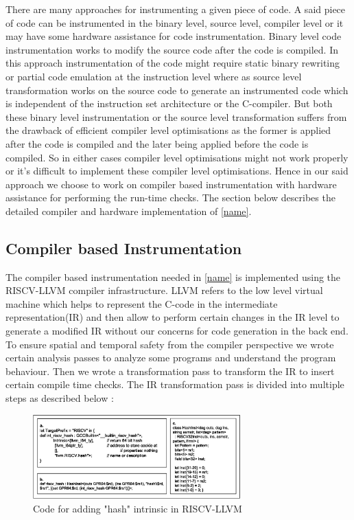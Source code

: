 There are many approaches for instrumenting a given piece of code. A said piece of code can be instrumented in the binary level, source level, compiler level or it may have some hardware assistance for code instrumentation. Binary level code instrumentation works to modify the source code after the code is compiled. In this approach instrumentation of the code might require static binary rewriting or partial code emulation at the instruction level where as source level transformation works on the source code to generate an instrumented code which is independent of the instruction set architecture or the C-compiler. But both these binary level instrumentation or the source level transformation suffers from the drawback of efficient compiler level optimisations as the former is applied after the code is compiled and the later being applied before the code is compiled. So in either cases compiler level optimisations might not work properly or it's difficult to implement these compiler level optimisations. Hence in our said approach we choose to work on compiler based instrumentation with hardware assistance for performing the run-time checks. The section below describes the detailed compiler and hardware implementation of \ref{name}.
\subsection{Compiler based Instrumentation}
The compiler based instrumentation needed in \ref{name} is implemented using the RISCV-LLVM compiler infrastructure. LLVM refers to the low level virtual machine which helps to represent the C-code in the intermediate representation(IR) and then allow to perform certain changes in the IR level to generate a modified IR without our concerns for code generation in the back end. To ensure spatial and temporal safety from the compiler perspective we wrote certain analysis passes to analyze some programs and understand the program behaviour. Then we wrote a transformation pass to transform the IR to insert certain compile time checks. The IR transformation pass is divided into multiple steps as described below : 
\begin{figure}
\centering
\captionsetup{justification=centering}
\includegraphics[width=8cm]{intrinsics.eps}
\caption{Code for adding "hash" intrinsic in RISCV-LLVM}
\label{fig:intrinsics}
\hrulefill
\end{figure}


